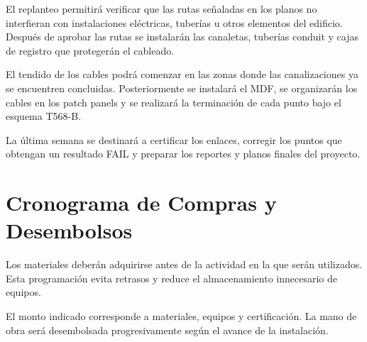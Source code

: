 El replanteo permitirá verificar que las rutas señaladas en los planos no interfieran con instalaciones eléctricas, tuberías u otros elementos del edificio. Después de aprobar las rutas se instalarán las canaletas, tuberías conduit y cajas de registro que protegerán el cableado.

El tendido de los cables podrá comenzar en las zonas donde las canalizaciones ya se encuentren concluidas. Posteriormente se instalará el MDF, se organizarán los cables en los patch panels y se realizará la terminación de cada punto bajo el esquema T568-B.

La última semana se destinará a certificar los enlaces, corregir los puntos que obtengan un resultado FAIL y preparar los reportes y planos finales del proyecto.

\section{Cronograma de Compras y Desembolsos}

Los materiales deberán adquirirse antes de la actividad en la que serán utilizados. Esta programación evita retrasos y reduce el almacenamiento innecesario de equipos.

\begin{table}[H]
\centering
\caption{Cronograma de compras y desembolsos.}
\label{tab:compras}
\end{table}

El monto indicado corresponde a materiales, equipos y certificación. La mano de obra será desembolsada progresivamente según el avance de la instalación.

